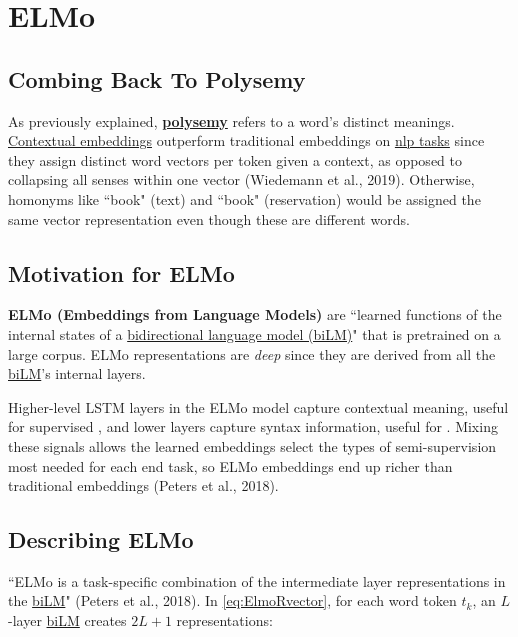 \section{ELMo} \label{sec:ELMo}


\subsection{Combing Back To Polysemy} \label{sec:PolysemyAgainInElmo} 

As previously explained, \textbf{\hyperref[sec:Polysemy]{polysemy}} refers to a word's distinct meanings. \hyperref[sec:SolutionWithContextEmbs]{Contextual embeddings} outperform traditional embeddings on \hyperref[app:Appendix_NLPTasks]{nlp tasks} since they assign distinct word vectors per token given a context, as opposed to collapsing all senses within one vector (Wiedemann et al., 2019). Otherwise, homonyms like ``book" (text) and ``book" (reservation) would be assigned the same vector representation even though these are different words.


\subsection{Motivation for ELMo} 

\textbf{ELMo (Embeddings from Language Models)} are ``learned functions of the internal states of a \hyperref[sec:BidirectionalLM]{bidirectional language model (biLM)}" that is pretrained on a large corpus. ELMo representations are \emph{deep} since they are derived from all the \hyperref[sec:BidirectionalLM]{biLM}'s internal layers. 

Higher-level LSTM layers in the ELMo model capture contextual meaning, useful for supervised , and lower layers capture syntax information, useful for . Mixing these signals allows the learned embeddings select the types of semi-supervision most needed for each end task, so ELMo embeddings end up richer than traditional embeddings (Peters et al., 2018). 


\subsection{Describing ELMo} 

``ELMo is a task-specific combination of the intermediate layer representations in the \hyperref[sec:BidirectionalLM]{biLM}" (Peters et al., 2018). In \cref{eq:ElmoRvector}, for each word token $t_k$, an $L$-layer \hyperref[sec:BidirectionalLM]{biLM} creates $2L + 1$ representations: 

